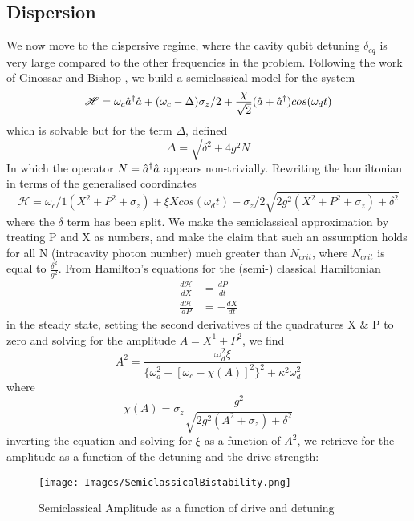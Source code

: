 \subsection{Dispersion}
We now move to the dispersive regime, where the cavity qubit detuning $\delta_{cq}$ is very large compared to the other frequencies in the problem. Following the work of Ginossar and Bishop \cite{Bishop2010}, we build a semiclassical model for the system
\begin{equation}
\mathscr{H} = \omega_c \hat{a}^\dagger \hat{a} + ( \omega_c - \Delta ) \sigma_z /2 + \frac{\chi}{\sqrt{2}} (\hat{a} + \hat{a}^\dagger ) cos(\omega_d t)
\end{equation}
which is solvable but for the term $\Delta$, defined
\begin{equation}
        \Delta = \sqrt{\delta^2 +4 g ^2 N}
\end{equation}
In which the operator $N = \hat{a}^\dagger \hat{a} $ appears non-trivially. Rewriting the hamiltonian in terms of the generalised coordinates
\begin{equation}
        \mathscr{H} = \omega_c/1 (X^2 + P^2 + \sigma_z) + \xi X cos(\omega_d t) - \sigma_z /2 \sqrt{2g^2(X^2+P^2+\sigma_z) + \delta^2}
\end{equation}
where the $\delta$ term has been split. We make the semiclassical approximation by treating P and X as numbers, and make the claim that such an assumption holds for all N (intracavity photon number) much greater than $N_{crit}$, where $N_{crit}$ is equal to $\frac{\delta^2}{g^2}$.
From Hamilton's equations for the (semi-) classical Hamiltonian
\begin{align}
        \frac{d\mathscr{H}}{dX} &= \frac{dP}{dt}\\
        \frac{d\mathscr{H}}{dP} &= -\frac{dX}{dt}
\end{align}
in the steady state, setting the second derivatives of the quadratures X \& P to zero and solving for the amplitude $A = X^1 + P^2$, we find
\begin{equation}
        A^2 = \frac{\omega_d^2\xi}{\{\omega_d^2 - [\omega_c - \chi (A) ]^2 \}^2+ \kappa^2 \omega_d^2}
\end{equation}
where
\begin{equation}
        \chi(A) = \sigma_z \frac{g^2}{\sqrt{2g^2(A^2 + \sigma_z) + \delta^2}}
\end{equation}
inverting the equation and solving for $\xi$ as a function of $A^2$, we retrieve for the amplitude as a function of the detuning and the drive strength:
\begin{figure*}
        \texttt{[image: Images/SemiclassicalBistability.png]}
        \caption{Semiclassical Amplitude as a function of drive and detuning}
\end{figure*}
